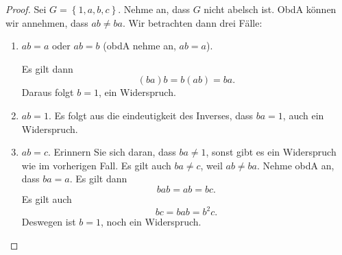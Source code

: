 \begin{proof}
	Sei $G=\left\{ 1,a,b,c \right\} $. Nehme an, dass $G$ nicht abelsch ist. ObdA können wir annehmen, dass $ab\neq ba$. Wir betrachten dann drei Fälle:
	\begin{enumerate}
		\item $ab=a$ oder $ab=b$ (obdA nehme an, $ab=a$).

			Es gilt dann
			\[
				(ba)b=b(ab)=ba
			.\] 
			Daraus folgt $b=1$, ein Widerspruch.

		\item $ab=1$. Es folgt aus die eindeutigkeit des Inverses, dass $ba=1$, auch ein Widerspruch.

		\item $ab=c$. Erinnern Sie sich daran, dass $ba\neq 1$, sonst gibt es ein Widerspruch wie im vorherigen Fall. Es gilt auch $ba\neq c$, weil $ab\neq ba$. Nehme obdA an, dass $ba=a$. Es gilt dann
			\[
			bab=ab=bc
			.\] 
			Es gilt auch
			\[
			bc=bab=b^2c
			.\] 
			Deswegen ist $b=1$, noch ein Widerspruch.\qedhere
	\end{enumerate}
\end{proof}
